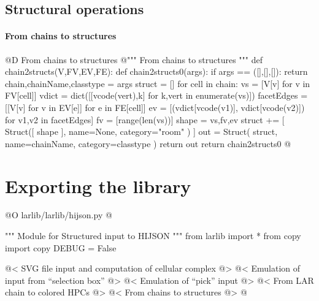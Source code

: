 \documentclass[11pt,oneside]{article}    %
\begin{document}
\subsection{Structural operations}

\paragraph{From chains to structures}
@D From chains to structures
@{""" From chains to structures """
def chain2structs(V,FV,EV,FE):
    def chain2structs0(args): 
        if args == ([],[],[]): return
        chain,chainName,classtype = args
        struct = []
        for cell in chain:
            vs = [V[v] for v in FV[cell]]
            vdict = dict([[vcode(vert),k] for k,vert in enumerate(vs)])
            facetEdges = [[V[v] for v in EV[e]] for e in FE[cell]]
            ev = [(vdict[vcode(v1)], vdict[vcode(v2)]) for v1,v2 in facetEdges]
            fv = [range(len(vs))]
            shape = vs,fv,ev
            struct += [ Struct([ shape ], name=None, category="room" ) ]
        out = Struct( struct, name=chainName, category=classtype )
        return out
    return chain2structs0
@}










\section{Exporting the library}


@O larlib/larlib/hijson.py
@{""" Module for Structured input to HIJSON """
from larlib import *
from copy import copy
DEBUG = False

@< SVG file input and computation of cellular complex @>
@< Emulation of input from ``selection box'' @>
@< Emulation of ``pick'' input @>
@< From LAR chain to colored HPCs @>
@< From chains to structures @>
@}
\end{document}
